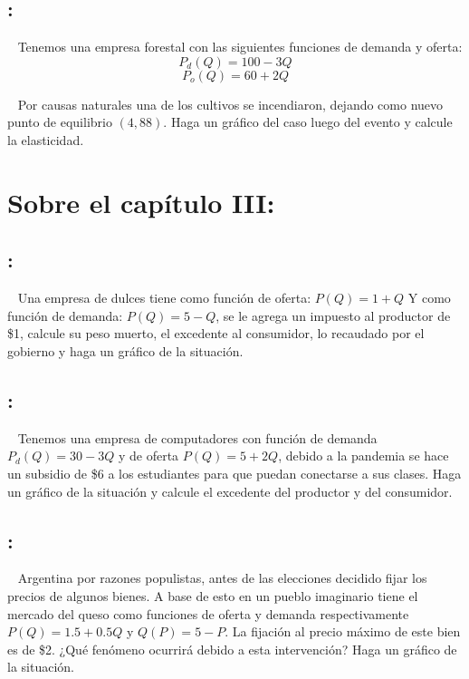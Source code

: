 \documentclass[
  letterpaper,
  DIV=11,
  numbers=noendperiod]{scrreport}
\begin{document}
\hypertarget{section-6}{%
\subsection{:}\label{section-6}}

~ Tenemos una empresa forestal con las siguientes funciones de demanda y
oferta: \[
P_d(Q)=100-3Q
\] \[
P_o(Q)=60+2Q
\]

~ Por causas naturales una de los cultivos se incendiaron, dejando como
nuevo punto de equilibrio \((4,88)\). Haga un gráfico del caso luego del
evento y calcule la elasticidad.

\hypertarget{sobre-el-capuxedtulo-iii}{%
\section{Sobre el capítulo III:}\label{sobre-el-capuxedtulo-iii}}

\hypertarget{section-7}{%
\subsection{:}\label{section-7}}

~ Una empresa de dulces tiene como función de oferta: \(P(Q)=1+Q\) Y
como función de demanda: \(P(Q)=5-Q\), se le agrega un impuesto al
productor de \$1, calcule su peso muerto, el excedente al consumidor, lo
recaudado por el gobierno y haga un gráfico de la situación.

\hypertarget{section-8}{%
\subsection{:}\label{section-8}}

~ Tenemos una empresa de computadores con función de demanda
\(P_d(Q)=30-3Q\) y de oferta \(P(Q)=5+2Q\), debido a la pandemia se hace
un subsidio de \$6 a los estudiantes para que puedan conectarse a sus
clases. Haga un gráfico de la situación y calcule el excedente del
productor y del consumidor.

\hypertarget{section-9}{%
\subsection{:}\label{section-9}}

~ Argentina por razones populistas, antes de las elecciones decidido
fijar los precios de algunos bienes. A base de esto en un pueblo
imaginario tiene el mercado del queso como funciones de oferta y demanda
respectivamente \(P(Q)=1.5+0.5Q\) y \(Q(P)=5-P\). La fijación al precio
máximo de este bien es de \$2. ¿Qué fenómeno ocurrirá debido a esta
intervención? Haga un gráfico de la situación.
\end{document}
